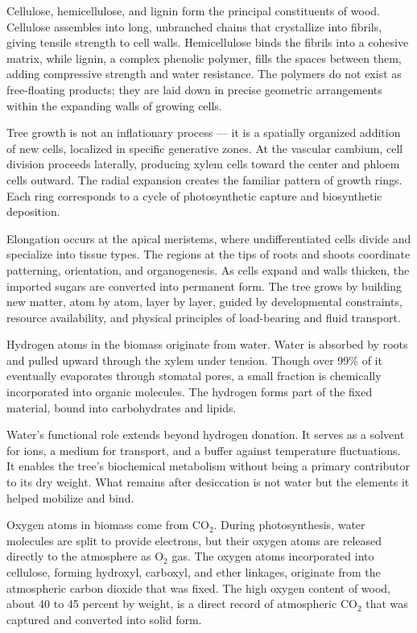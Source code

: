 Cellulose, hemicellulose, and lignin form the principal constituents of wood. Cellulose assembles into long, unbranched chains that crystallize into fibrils, giving tensile strength to cell walls. Hemicellulose binds the fibrils into a cohesive matrix, while lignin, a complex phenolic polymer, fills the spaces between them, adding compressive strength and water resistance. The polymers do not exist as free-floating products; they are laid down in precise geometric arrangements within the expanding walls of growing cells.

Tree growth is not an inflationary process — it is a spatially organized addition of new cells, localized in specific generative zones. At the vascular cambium, cell division proceeds laterally, producing xylem cells toward the center and phloem cells outward. The radial expansion creates the familiar pattern of growth rings. Each ring corresponds to a cycle of photosynthetic capture and biosynthetic deposition.

Elongation occurs at the apical meristems, where undifferentiated cells divide and specialize into tissue types. The regions at the tips of roots and shoots coordinate patterning, orientation, and organogenesis. As cells expand and walls thicken, the imported sugars are converted into permanent form. The tree grows by building new matter, atom by atom, layer by layer, guided by developmental constraints, resource availability, and physical principles of load-bearing and fluid transport.

Hydrogen atoms in the biomass originate from water. Water is absorbed by roots and pulled upward through the xylem under tension. Though over 99\% of it eventually evaporates through stomatal pores, a small fraction is chemically incorporated into organic molecules. The hydrogen forms part of the fixed material, bound into carbohydrates and lipids.

Water's functional role extends beyond hydrogen donation. It serves as a solvent for ions, a medium for transport, and a buffer against temperature fluctuations. It enables the tree's biochemical metabolism without being a primary contributor to its dry weight. What remains after desiccation is not water but the elements it helped mobilize and bind.

Oxygen atoms in biomass come from \(\mathrm{CO}_2\). During photosynthesis, water molecules are split to provide electrons, but their oxygen atoms are released directly to the atmosphere as \(\mathrm{O}_2\) gas. The oxygen atoms incorporated into cellulose, forming hydroxyl, carboxyl, and ether linkages, originate from the atmospheric carbon dioxide that was fixed. The high oxygen content of wood, about 40 to 45 percent by weight, is a direct record of atmospheric \(\mathrm{CO}_2\) that was captured and converted into solid form.


